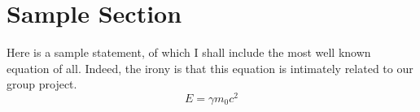 \documentclass[a4paper]{report}
\begin{document}
\tableofcontents

\section{Sample Section}
Here is a sample statement, of which I shall 
include the most well known equation of all. 
Indeed, the irony is that this equation is 
intimately related to our group project. 
\[ 
E = \gamma m_0 c^2
\]
\end{document}

